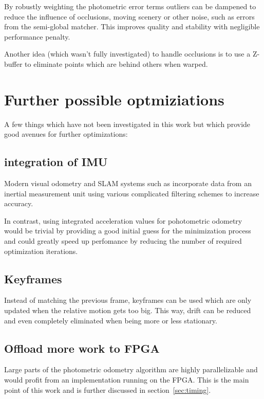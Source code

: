 By robustly weighting the photometric error terms outliers can be dampened to
reduce the influence of occlusions, moving scenery or other noise, such as
errors from the semi-global matcher. This improves quality and stability with
negligible performance penalty.

Another idea (which wasn't fully investigated) to handle occlusions is to use a
Z-buffer to eliminate points which are behind others when warped.


\section{Further possible optmiziations}

A few things which have not been investigated in this work but which provide
good avenues for further optimizations:

\subsection{integration of IMU}

Modern visual odometry and SLAM systems such as \cite{leutenegger2013keyframe}
incorporate data from an inertial measurement unit using various complicated
filtering schemes to increase accuracy.

In contrast, using integrated acceleration values for pohotometric odometry
would be trivial by providing a good initial guess for the minimization process
and could greatly speed up perfomance by reducing the number of required
optimization iterations.

\subsection{Keyframes}

Instead of matching the previous frame, keyframes can be used which are only
updated when the relative motion gets too big. This way, drift can be reduced
and even completely eliminated when being more or less stationary.

\subsection{Offload more work to FPGA}

Large parts of the photometric odometry algorithm are highly parallelizable and
would profit from an implementation running on the FPGA. This is the main point
of this work and is further discussed in section~\ref{sec:timing}.



